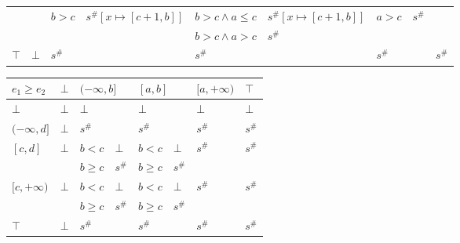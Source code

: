 \documentclass{article}
\begin{document}
\begin{table}[]
{\begin{tabular}{|l|l|ll|ll|ll|l|}
                                    &                         & \multirow{2}{*}{$b > c$} & \multirow{2}{*}{$s^\#[x \mapsto [c + 1, b]]$} & $b > c \land a \le c$ & $s^\#[x \mapsto [c + 1, b]]$ & \multirow{2}{*}{$a > c$} & \multirow{2}{*}{$s^\#$}        &                                                 \\
                                    &                         &                          &                                               & $b > c \land a > c$   & $s^\#$                   &                          &                                &                                                 \\ \hline
    $\top$                          & $\bot$                  & \multicolumn{2}{l|}{$s^\#$}                                              & \multicolumn{2}{l|}{$s^\#$}                      & \multicolumn{2}{l|}{$s^\#$}                               & $s^\#$                                          \\ \hline
    \end{tabular}}
    \end{table}

    \begin{table}
        \begin{tabular}{|l|l|ll|ll|l|l|}
        \hline
        $e_1 \ge e_2$  & $\bot$ & \multicolumn{2}{l|}{$(-\infty, b]$} & \multicolumn{2}{l|}{$[a, b]$} & $[a, +\infty)$          & $\top$                  \\ \hline
        $\bot$         & $\bot$ & \multicolumn{2}{l|}{$\bot$}         & \multicolumn{2}{l|}{$\bot$}   & $\bot$                  & $\bot$                  \\ \hline
        $(-\infty, d]$ & $\bot$ & \multicolumn{2}{l|}{$s^\#$}         & \multicolumn{2}{l|}{$s^\#$}   & $s^\#$                  & $s^\#$                  \\ \hline
        $[c, d]$       & $\bot$ & $b < c$            & $\bot$         & $b < c$         & $\bot$      & \multirow{2}{*}{$s^\#$} & \multirow{2}{*}{$s^\#$} \\
                       &        & $b \ge c$          & $s^\#$         & $b \ge c$       & $s^\#$      &                         &                         \\ \hline
        $[c, +\infty)$ & $\bot$ & $b < c$            & $\bot$         & $b < c$         & $\bot$      & \multirow{2}{*}{$s^\#$} & \multirow{2}{*}{$s^\#$} \\
                       &        & $b \ge c$          & $s^\#$         & $b \ge c$       & $s^\#$      &                         &                         \\ \hline
        $\top$         & $\bot$ & \multicolumn{2}{l|}{$s^\#$}         & \multicolumn{2}{l|}{$s^\#$}   & $s^\#$                  & $s^\#$                  \\ \hline
        \end{tabular}
        \end{table}
\end{document}
